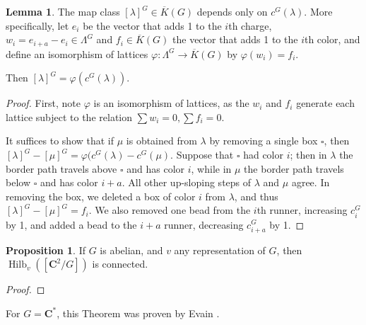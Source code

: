 \documentclass{amsart}[12pt]
\theoremstyle{definition}
\newtheorem{lemma}[dummy]{Lemma}
\newtheorem{proposition}[dummy]{Proposition}
\newcommand{\C}{\mathbf{C}}
\DeclareMathOperator{\Hilb}{Hilb}
\begin{document}
\begin{center}
\end{center}



\begin{lemma}
  The map class $[\lambda]^G\in\overline{K}(G)$ depends only on $c^G(\lambda)$.  
More specifically, let $e_i$ be the vector that adds 1 to the $i$th charge, $w_i=e_{i+a}-e_i\in\Lambda^G$ and $f_i\in\overline{K}(G)$ the vector that adds 1 to the $i$th color, and define an isomorphism of lattices $\varphi:\Lambda^G\to\overline{K}(G)$ by $\varphi(w_i)=f_i$.

Then $[\lambda]^G=\varphi(c^G(\lambda))$.
\end{lemma}

\begin{proof}
First, note $\varphi$ is an isomorphism of lattices, as the $w_i$ and $f_i$ generate each lattice subject to the relation $\sum w_i=0, \sum f_i=0$.

It suffices to show that if $\mu$ is obtained from $\lambda$ by removing a single box $\square$, then $[\lambda]^G-[\mu]^G=\varphi(c^G(\lambda)-c^G(\mu)$.  Suppose that $\square$ had color $i$; then in $\lambda$ the border path travels above $\square$ and has color $i$, while in $\mu$ the border path travels below $\square$ and has color $i+a$.  All other up-sloping steps of $\lambda$ and $\mu$ agree.  In removing the box, we deleted a box of color $i$ from $\lambda$, and thus $[\lambda]^G-[\mu]^G=f_i$.  We also removed one bead from the $i$th runner, increasing $c^G_i$ by 1, and added a bead to the $i+a$ runner, decreasing $c^G_{i+a}$ by 1.


\end{proof}


\begin{proposition} \label{prop:connected}
If $G$ is abelian, and $v$ any representation of $G$, then $\Hilb_v([\C^2/G])$ is connected.  
\end{proposition}
\begin{proof}

\end{proof}
For $G=\C^*$, this Theorem was proven by Evain \cite{evain1}.
\end{document}
